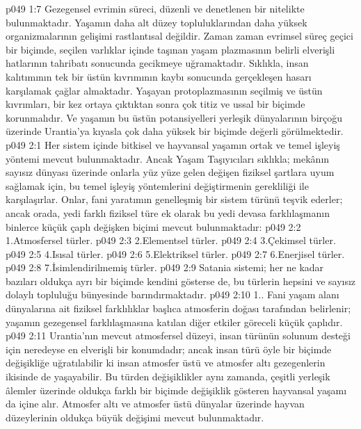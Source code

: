 \vs p049 1:7 Gezegensel evrimin süreci, düzenli ve denetlenen bir nitelikte bulunmaktadır. Yaşamın daha alt düzey topluluklarından daha yüksek organizmalarının gelişimi rastlantısal değildir. Zaman zaman evrimsel süreç geçici bir biçimde, seçilen varlıklar içinde taşınan yaşam plazmasının belirli elverişli hatlarının tahribatı sonucunda gecikmeye uğramaktadır. Sıklıkla, insan kalıtımının tek bir üstün kıvrımının kaybı sonucunda gerçekleşen hasarı karşılamak çağlar almaktadır. Yaşayan protoplazmasının seçilmiş ve üstün kıvrımları, bir kez ortaya çıktıktan sonra çok titiz ve ussal bir biçimde korunmalıdır. Ve yaşamın bu üstün potansiyelleri yerleşik dünyalarının birçoğu üzerinde Urantia’ya kıyasla çok daha yüksek bir biçimde değerli görülmektedir.
\vs p049 2:1 Her sistem içinde bitkisel ve hayvansal yaşamın ortak ve temel işleyiş yöntemi mevcut bulunmaktadır. Ancak Yaşam Taşıyıcıları sıklıkla; mekânın sayısız dünyası üzerinde onlarla yüz yüze gelen değişen fiziksel şartlara uyum sağlamak için, bu temel işleyiş yöntemlerini değiştirmenin gerekliliği ile karşılaşırlar. Onlar, fani yaratımın genelleşmiş bir sistem türünü teşvik ederler; ancak orada, yedi farklı fiziksel türe ek olarak bu yedi devasa farklılaşmanın binlerce küçük çaplı değişken biçimi mevcut bulunmaktadır:
\vs p049 2:2 1.\bibnobreakspace Atmosfersel türler.
\vs p049 2:3 2.\bibnobreakspace Elementsel türler.
\vs p049 2:4 3.\bibnobreakspace Çekimsel türler.
\vs p049 2:5 4.\bibnobreakspace Isısal türler.
\vs p049 2:6 5.\bibnobreakspace Elektriksel türler.
\vs p049 2:7 6.\bibnobreakspace Enerjisel türler.
\vs p049 2:8 7.\bibnobreakspace İsimlendirilmemiş türler.
\vs p049 2:9 Satania sistemi; her ne kadar bazıları oldukça ayrı bir biçimde kendini gösterse de, bu türlerin hepsini ve sayısız dolaylı topluluğu bünyesinde barındırmaktadır.
\vs p049 2:10 1.\bibnobreakspace {}. Fani yaşam alanı dünyalarına ait fiziksel farklılıklar başlıca atmosferin doğası tarafından belirlenir; yaşamın gezegensel farklılaşmasına katılan diğer etkiler göreceli küçük çaplıdır.
\vs p049 2:11 Urantia’nın mevcut atmosfersel düzeyi, insan türünün solunum desteği için neredeyse en elverişli bir konumdadır; ancak insan türü öyle bir biçimde değişikliğe uğratılabilir ki insan atmosfer üstü ve atmosfer altı gezegenlerin ikisinde de yaşayabilir. Bu türden değişiklikler aynı zamanda, çeşitli yerleşik âlemler üzerinde oldukça farklı bir biçimde değişiklik gösteren hayvansal yaşamı da içine alır. Atmosfer altı ve atmosfer üstü dünyalar üzerinde hayvan düzeylerinin oldukça büyük değişimi mevcut bulunmaktadır.

